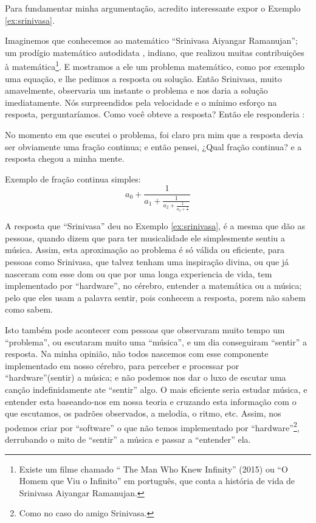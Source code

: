 Para fundamentar minha argumentação, acredito interessante expor o Exemplo \ref{ex:srinivasa}. 
\begin{example}
\label{ex:srinivasa}
Imaginemos que conhecemos ao matemático ``Srinivasa Aiyangar Ramanujan'';
um prodígio matemático autodidata \cite[pp. 1]{kanigel2016man}, indiano, que 
realizou muitas contribuições à matemática\footnote{Existe 
um filme chamado `` The Man Who Knew Infinity'' (2015) ou 
``O Homem que Viu o Infinito'' em português, que conta a história de vida de Srinivasa Aiyangar Ramanujan.}.
E mostramos a ele um problema matemático, como por exemplo uma equação,
e  lhe pedimos a resposta ou solução. 
Então Srinivasa, muito amavelmente, 
observaria um instante o problema e nos daria a solução imediatamente.
Nós surpreendidos pela velocidade e o mínimo esforço na resposta,
perguntaríamos. Como você obteve a resposta? Então ele responderia \cite[pp. 235]{kanigel2016man}: 
\begin{citando}
No momento em que escutei o problema, 
foi claro pra mim que a resposta devia ser obviamente uma fração continua; 
e então pensei, ¿Qual fração continua? e a resposta chegou a minha mente. 
\end{citando}

Exemplo de fração continua simples:
\begin{equation}
a_{0}+{\frac {1}{a_{1}+{\frac {1}{a_{2}+{\frac {1}{a_{3}+{\frac {1}{\ddots }}}}}}}}
\end{equation}
\end{example}

A resposta que ``Srinivasa'' deu no Exemplo  \ref{ex:srinivasa}, 
é a mesma  que dão as pessoas, quando  dizem que para ter musicalidade ele simplesmente sentiu a música. 
Assim, esta aproximação ao problema é só válida ou eficiente, para pessoas como Srinivasa, 
que talvez tenham uma inspiração divina, 
ou que já nasceram com esse dom ou que por uma longa experiencia de vida, 
tem implementado por ``hardware'', no cérebro, entender a matemática ou a música; 
pelo que eles usam a palavra sentir, 
pois conhecem a resposta, porem não sabem como sabem. 

Isto também pode acontecer com pessoas que observaram muito tempo um ``problema'', ou escutaram muito uma ``música'', 
e um dia conseguiram ``sentir'' a resposta. Na minha opinião, 
não todos nascemos com esse componente implementado em nosso cérebro, para perceber e processar por ``hardware''(sentir) a música; 
e não podemos nos dar o luxo de escutar uma canção indefinidamente ate ``sentir'' algo. 
O mais eficiente seria estudar música, 
e entender esta baseando-nos em nossa teoria e cruzando esta informação com o que escutamos,
os padrões observados, a melodia, o ritmo, etc. 
Assim, nos podemos criar por ``software'' o que não temos implementado por ``hardware''\footnote{Como no caso do amigo Srinivasa.}, 
derrubando o mito de ``sentir'' a música e passar a ``entender'' ela.

